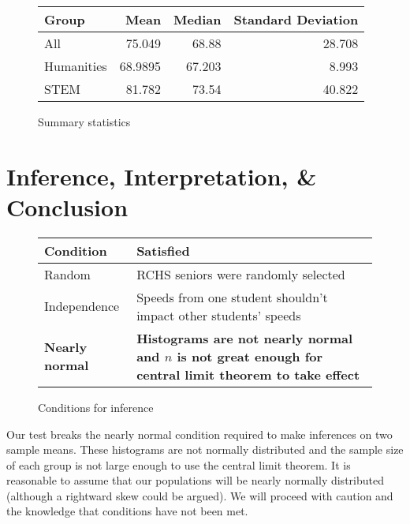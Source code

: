 \documentclass{article}
\begin{document}
\newpage

\begin{figure}[ht]
    \centering
    \begin{tabular}{lrrr}
        \toprule
        Group & Mean & Median & Standard Deviation \\
        \midrule
        All & 75.049 & 68.88 & 28.708 \\
        Humanities & 68.9895 & 67.203 & 8.993 \\
        STEM & 81.782 & 73.54 & 40.822 \\
    \end{tabular}
    \caption{Summary statistics}
    \label{table:summary}
\end{figure}

\section{Inference, Interpretation, \& Conclusion}

\begin{figure}[ht]
    \centering
    \begin{tabular}{lp{}}
        \toprule
        Condition & Satisfied \\
        \midrule
        Random & RCHS seniors were randomly selected \\
        Independence & Speeds from one student shouldn't impact other students' speeds \\
        \bf{Nearly normal} & \bf{Histograms are not nearly normal and $n$ is
        not great enough for central limit theorem to take effect} \\
    \end{tabular}
    \caption{Conditions for inference}
    \label{table:conditions}
\end{figure}

Our test breaks the nearly normal condition required to make inferences on two
sample means. These histograms are not normally distributed and the sample size
of each group is not large enough to use the central limit theorem. It is
reasonable to assume that our populations will be nearly normally distributed
(although a rightward skew could be argued). We will proceed with caution and
the knowledge that conditions have not been met.

\newpage
\end{document}
